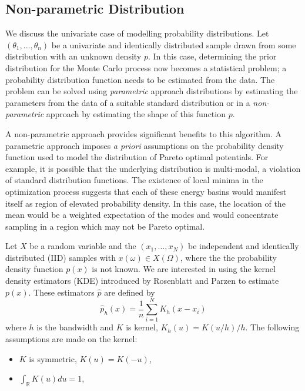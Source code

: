\subsection{Non-parametric Distribution}
We discuss the univariate case of modelling probability distributions.
Let $(\theta_1,...,\theta_n)$ be a univariate and identically distributed sample drawn from some distribution with an unknown density $p$.
In this case, determining the prior distribution for the Monte Carlo process now becomes a statistical problem; a probability distribution function needs to be estimated from the data.  The problem can be solved using \emph{parametric} approach distributions by estimating the parameters from the data of a suitable standard distribution or in a \emph{non-parametric} approach by estimating the shape of this function $p$.

A non-parametric approach provides significant benefits to this algorithm.  A parametric approach imposes \emph{a priori} assumptions on the probability density function used to model the distribution of Pareto optimal potentials.  For example, it is possible that the underlying distribution is multi-modal, a violation of standard distribution functions.  The existence of local minima in the optimization process suggests that each of these energy basins would manifest itself as region of elevated probability density.  In this case, the location of the mean would be a weighted expectation of the modes and would concentrate sampling in a region which may not be Pareto optimal.


Let $X$ be a random variable and the $(x_1,...,x_N)$ be independent and identically distributed (IID) samples with $x(\omega) \in X(\Omega)$, where the the probability density function $p(x)$ is not known.  We are interested in using the kernel density estimators (KDE) introduced by Rosenblatt\cite{rosenblatt1956_kde} and Parzen\cite{parzen1962_kde} to estimate $p(x)$.   These estimators $\hat{p}$ are defined by
\begin{equation}
\label{eq:kde_univariate}
    \hat{p}_h(x) = \frac{1}{n} \sum_{i=1}^N K_h(x-x_i)
\end{equation}
where $h$ is the bandwidth and $K$ is kernel, $K_h(u)=K(u/h)/h$.  The following assumptions are made on the kernel:
\begin{itemize}
    \item $K$ is symmetric, $K(u)=K(-u)$,
    \item $\int_\mathbb{R} K(u)du = 1$,
\end{itemize}

